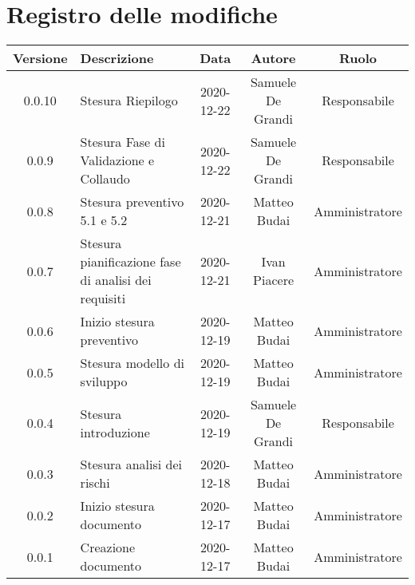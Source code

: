 \section*{Registro delle modifiche}

\begin{center}
	\begin{longtable}{|c|p{5cm}|c|c|c|}
	\hline
	\rowcolor{lighter-grayer}
	\textbf{Versione} & \textbf{Descrizione} & \textbf{Data} & \textbf{Autore} & \textbf{Ruolo} \\
	\hline
	\endfirsthead

	0.0.10 & Stesura Riepilogo & 2020-12-22 & Samuele De Grandi & Responsabile \\
	0.0.9 & Stesura Fase di Validazione e Collaudo & 2020-12-22 & Samuele De Grandi & Responsabile \\
	\hline
	0.0.8 & Stesura preventivo 5.1 e 5.2 & 2020-12-21 & Matteo Budai & Amministratore \\
	\hline
	0.0.7 & Stesura pianificazione fase di analisi dei requisiti & 2020-12-21 & Ivan Piacere & Amministratore \\
	\hline
	0.0.6 & Inizio stesura preventivo & 2020-12-19 & Matteo Budai & Amministratore \\
	\hline
	0.0.5 & Stesura modello di sviluppo & 2020-12-19 & Matteo Budai & Amministratore \\
	\hline
	0.0.4 & Stesura introduzione & 2020-12-19 & Samuele De Grandi & Responsabile \\
	\hline
	0.0.3 & Stesura analisi dei rischi & 2020-12-18 & Matteo Budai & Amministratore \\
	\hline
	0.0.2 & Inizio stesura documento & 2020-12-17 & Matteo Budai & Amministratore \\
	\hline
	0.0.1 & Creazione documento & 2020-12-17 & Matteo Budai & Amministratore \\
	\hline

	\end{longtable}
\end{center}